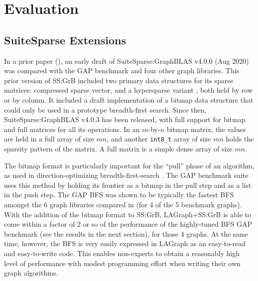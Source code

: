 \section{Evaluation}
\label{sec:evaluation}


\subsection{SuiteSparse Extensions}
\label{sec:extensions}


In a prior paper (\cite{DBLP:conf/iiswc/AzadABBCDDDDFGG20}), an early draft of
SuiteSparse:GraphBLAS v4.0.0 (Aug 2020) was compared with the GAP benchmark
\cite{DBLP:conf/sc/BeamerAP12} and four other graph libraries.  This prior
version of SS:GrB included two primary data structures for its sparse matrices:
compressed sparse vector, and a hypersparse variant
\cite{DBLP:conf/ipps/BulucG08}, both held by row or by column.  It included a
draft implementation of a bitmap data structure that could only be used in a
prototype breadth-first search.  Since then, SuiteSparse:GraphBLAS v4.0.3 has
been released, with full support for bitmap and full matrices for all its
operations.  In an $m$-by-$n$ bitmap matrix, the values are held in a full
array of size $mn$, and another \verb'int8_t' array of size $mn$ holds the
sparsity pattern of the matrix.  A full matrix is a simple dense array of size
$mn$.

The bitmap format is particularly important for the ``pull'' phase of an
algorithm, as used in direction-optimizing breadth-first-search
\cite{DBLP:conf/sc/BeamerAP12,DBLP:conf/icpp/YangBO18}.  The GAP benchmark suite uses this method by
holding its frontier as a bitmap in the pull step and as a list in the push
step. The GAP BFS was shown to be typically the fastest BFS amongst the 6 graph
libraries compared in \cite{DBLP:conf/iiswc/AzadABBCDDDDFGG20} (for 4 of the 5
benchmark graphs).  With the addition of the bitmap format to SS:GrB,
LAGraph+SS:GrB is able to come within a factor of 2 or so of the performance of
the highly-tuned BFS GAP benchmark (see the results in the next section), for
those 4 graphs.  At the same time, however, the BFS is very easily expressed in
LAGraph as an easy-to-read and easy-to-write code.  This enables non-experts to
obtain a reasonably high level of performance with modest programming effort
when writing their own graph algorithms.

